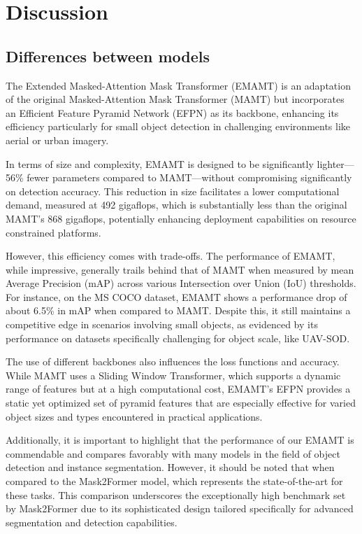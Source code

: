 \chapter{Discussion}


\section{Differences between models}

The Extended Masked-Attention Mask Transformer (EMAMT) is an adaptation of the original Masked-Attention Mask Transformer (MAMT) but incorporates 
an Efficient Feature Pyramid Network (EFPN) as its backbone, enhancing its efficiency particularly for small object detection in challenging environments 
like aerial or urban imagery. 

In terms of size and complexity, EMAMT is designed to be significantly lighter—56\% fewer parameters compared to MAMT—without compromising significantly 
on detection accuracy. This reduction in size facilitates a lower computational demand, measured at 492 gigaflops, which is substantially less than the 
original MAMT's 868 gigaflops, potentially enhancing deployment capabilities on resource constrained platforms.

However, this efficiency comes with trade-offs. The performance of EMAMT, while impressive, generally trails behind that of MAMT when measured by 
mean Average Precision (mAP) across various Intersection over Union (IoU) thresholds. For instance, on the MS COCO dataset, EMAMT shows a performance drop 
of about 6.5\% in mAP when compared to MAMT. Despite this, it still maintains a competitive edge in scenarios involving small objects, as evidenced by its 
performance on datasets specifically challenging for object scale, like UAV-SOD.

The use of different backbones also influences the loss functions and accuracy. While MAMT uses a Sliding Window Transformer, which supports a dynamic 
range of features but at a high computational cost, EMAMT's EFPN provides a static yet optimized set of pyramid features that are especially effective for 
varied object sizes and types encountered in practical applications.

Additionally, it is important to highlight that the performance of our EMAMT is commendable and compares favorably with many models in the field of object 
detection and instance segmentation. However, it should be noted that when compared to the Mask2Former model, which represents the state-of-the-art for these tasks.
This comparison underscores the exceptionally high benchmark set by Mask2Former due to its sophisticated design tailored specifically for advanced 
segmentation and detection capabilities.

